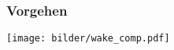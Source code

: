 \begin{frame}
	\frametitle{Vorgehen}
		\centering
		\texttt{[image: bilder/wake\_comp.pdf]}
\end{frame}
